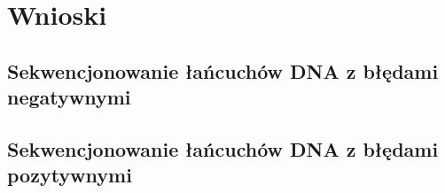 \documentclass[a4paper]{article}
\begin{document}
\section{Wnioski}

\subsection{Sekwencjonowanie łańcuchów DNA z błędami negatywnymi}

\subsection{Sekwencjonowanie łańcuchów DNA z błędami pozytywnymi}
\end{document}
